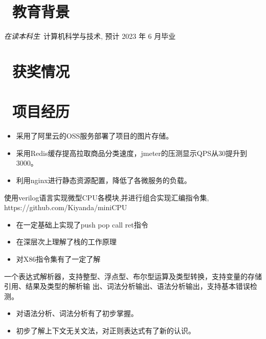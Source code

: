 \documentclass{resume}
\begin{document}
\normalsize{%

\section{\faGraduationCap\ 教育背景}
\textit{在读本科生}\ 计算机科学与技术, 预计 2023 年 6 月毕业

\section{\faHeartO\ 获奖情况}

\section{\faUsers\ 项目经历}
\begin{itemize}
  \item 采用了阿里云的OSS服务部署了项目的图片存储。
  \item 采用Redis缓存提高拉取商品分类速度，jmeter的压测显示QPS从30提升到3000。
  \item 利用nginx进行静态资源配置，降低了各微服务的负载。
\end{itemize}

使用verilog语言实现微型CPU各模块,并进行组合实现汇编指令集, https://github.com/Kiyanda/miniCPU
\begin{itemize}
  \item 在一定基础上实现了push pop call ret指令
  \item 在深层次上理解了栈的工作原理
  \item 对X86指令集有了一定了解
\end{itemize}

一个表达式解析器，支持整型、浮点型、布尔型运算及类型转换，支持变量的存储引用、结果及类型的解析输
出、词法分析输出、语法分析输出，支持基本错误检测。
\begin{itemize}
  \item 对语法分析、词法分析有了初步掌握。
  \item 初步了解上下文无关文法，对正则表达式有了新的认识。
\end{itemize}

}
\end{document}
